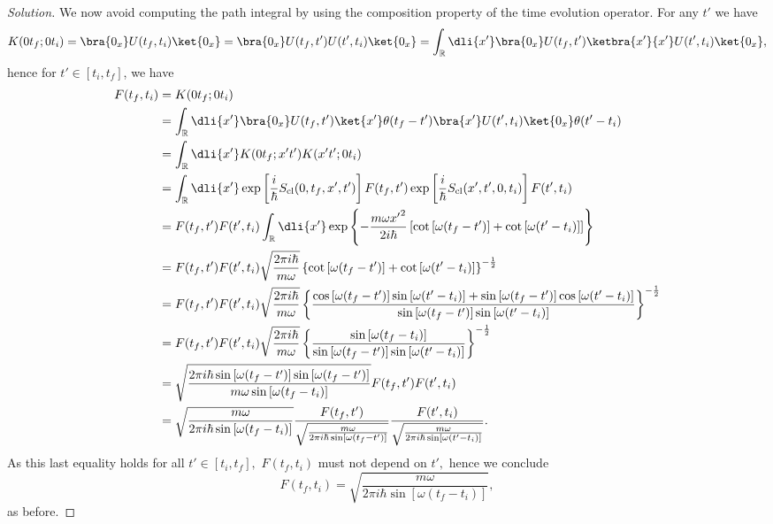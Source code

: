 \begin{proof}[Solution]
   We now avoid computing the path integral by using the composition property of the time evolution operator. For any \(t'\) we have
   \begin{equation*}
      K(0 t_f; 0 t_i) = \bra{0_x} U(t_f, t_i) \ket{0_x} = \bra{0_x} U(t_f, t') U(t', t_i) \ket{0_x} = \int_{\mathbb{R}}\dli{x'} \bra{0_x} U(t_f, t') \ketbra{x'}{x'} U(t', t_i) \ket{0_x},
   \end{equation*}
   hence for \(t' \in [t_i, t_f]\), we have
   \begin{align*}
      F(t_f, t_i) &= K(0 t_f; 0 t_i)\\
                  &= \int_{\mathbb{R}} \dli{x'} \bra{0_x}U(t_f, t')\ket{x'} \theta(t_f - t') \bra{x'} U(t', t_i) \ket{0_x} \theta(t' - t_i)\\
                      &= \int_{\mathbb{R}} \dli{x'} K(0t_f; x' t') K(x' t'; 0t_i)\\
                      &= \int_{\mathbb{R}} \dli{x'} \exp\left[\frac{i}{\hbar}S_\mathrm{cl}(0, t_f, x', t')\right] F(t_f, t') \exp\left[\frac{i}{\hbar}S_\mathrm{cl}(x', t', 0, t_i)\right] F(t', t_i)\\
                      &= F(t_f, t') F(t', t_i) \int_{\mathbb{R}} \dli{x'} \exp\left\{-\frac{m \omega {x'}^2}{2i\hbar} \left[\cot\left[\omega(t_f - t')\right] + \cot\left[\omega(t' - t_i)\right] \right]\right\}\\
                      &= F(t_f, t') F(t', t_i) \sqrt{\frac{2 \pi i\hbar}{m \omega}} \left\{\cot\left[\omega(t_f - t')\right] + \cot\left[\omega(t' - t_i)\right]\right\}^{-\frac12}\\
                      &= F(t_f, t') F(t', t_i) \sqrt{\frac{2 \pi i \hbar}{m \omega}} \left\{\frac{\cos\left[\omega(t_f - t')\right]\sin\left[\omega(t' - t_i)\right] + \sin\left[\omega(t_f - t')\right]\cos\left[\omega(t' - t_i)\right]}{\sin\left[\omega(t_f - t')\right]\sin\left[\omega(t' - t_i)\right]}\right\}^{-\frac12}\\
                      &= F(t_f, t') F(t', t_i) \sqrt{\frac{2 \pi i \hbar}{m \omega}} \left\{\frac{\sin\left[\omega(t_f - t_i)\right]}{\sin\left[\omega(t_f - t')\right]\sin\left[\omega(t' - t_i)\right]}\right\}^{-\frac12}\\
                      &= \sqrt{\frac{2\pi i \hbar \sin\left[\omega (t_f - t')\right]\sin\left[\omega (t_f - t')\right]}{m \omega \sin\left[\omega(t_f - t_i)\right]}} F(t_f, t') F(t', t_i)\\
                      &= \sqrt{\frac{m \omega}{2\pi i \hbar \sin\left[\omega(t_f - t_i)\right]}} \frac{F(t_f, t')}{\sqrt{\frac{m \omega}{2\pi i\hbar \sin\left[\omega( t_f - t')\right]}}} \frac{F(t', t_i)}{\sqrt{\frac{m \omega}{2\pi i\hbar \sin\left[\omega(t' - t_i)\right]}}}.
   \end{align*}
   As this last equality holds for all \(t' \in [t_i, t_f],\) \(F(t_f, t_i)\) must not depend on \(t',\) hence we conclude
   \begin{equation*}
       F(t_f, t_i) = \sqrt{\frac{m \omega}{2\pi i \hbar \sin\left[\omega(t_f - t_i)\right]}},
   \end{equation*}
   as before.


\end{proof}
